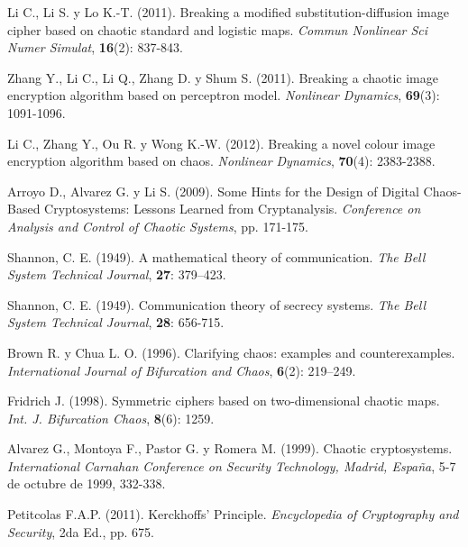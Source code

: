 \begin{thebibliography}{00}
Li C., Li S. y Lo K.-T. (2011).
\newblock Breaking a modified substitution-diffusion image cipher based on chaotic standard and logistic maps.
\newblock \emph{Commun Nonlinear Sci Numer Simulat}, \textbf{16}(2): 837-843.

Zhang Y., Li C., Li Q., Zhang D. y Shum S. (2011).
\newblock Breaking a chaotic image encryption algorithm based on perceptron model.
\newblock \emph{Nonlinear Dynamics}, \textbf{69}(3): 1091-1096.

Li C., Zhang Y., Ou R. y Wong K.-W. (2012).
\newblock Breaking a novel colour image encryption algorithm based on chaos.
\newblock \emph{Nonlinear Dynamics}, \textbf{70}(4): 2383-2388.

Arroyo D., Alvarez G. y Li S. (2009).
\newblock Some Hints for the Design of Digital Chaos-Based Cryptosystems: Lessons Learned from Cryptanalysis.
\newblock \emph{Conference on Analysis and Control of Chaotic Systems}, pp. 171-175.

Shannon, C. E. (1949).
\newblock A mathematical theory of communication.
\newblock \emph{The Bell System Technical Journal}, \textbf{27}: 379–423.

Shannon, C. E. (1949).
\newblock Communication theory of secrecy systems.
\newblock \emph{The Bell System Technical Journal}, \textbf{28}: 656-715.

Brown R. y Chua L. O. (1996).
\newblock Clarifying chaos: examples and counterexamples.
\newblock \emph{International Journal of Bifurcation and Chaos}, \textbf{6}(2): 219–249.

Fridrich J. (1998).
\newblock Symmetric ciphers based on two-dimensional chaotic maps.
\newblock \emph{Int. J. Bifurcation Chaos}, \textbf{8}(6): 1259.

Alvarez G., Montoya F., Pastor G. y Romera M. (1999).
\newblock Chaotic cryptosystems.
\newblock \emph{International Carnahan Conference on Security Technology, Madrid, España}, 5-7 de octubre de 1999, 332-338.

Petitcolas F.A.P. (2011).
\newblock Kerckhoffs’ Principle.
\newblock \emph{Encyclopedia of Cryptography and Security}, 2da Ed., pp. 675.


\end{thebibliography}
